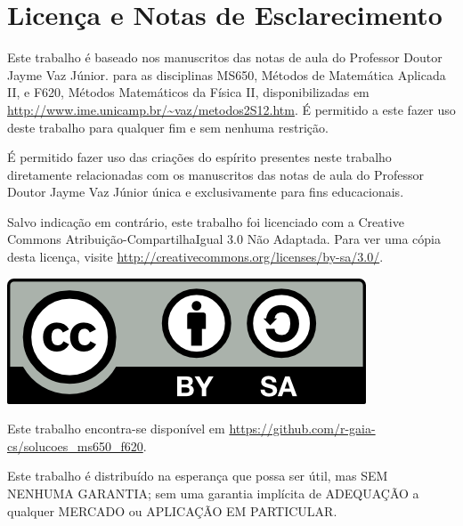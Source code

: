 %
%
%
%
%


\chapter{Licença e Notas de Esclarecimento}
Este trabalho é baseado nos manuscritos das notas de aula do Professor Doutor
Jayme Vaz Júnior. para as disciplinas MS650, Métodos de Matemática Aplicada II, e
F620, Métodos Matemáticos da Física II, disponibilizadas em
\url{http://www.ime.unicamp.br/~vaz/metodos2S12.htm}. É permitido a este fazer
uso deste trabalho para qualquer fim e sem nenhuma restrição.

É permitido fazer uso das criações do espírito presentes neste trabalho
diretamente relacionadas com os manuscritos das notas de aula do Professor
Doutor Jayme Vaz Júnior única e exclusivamente para fins educacionais.

Salvo indicação em contrário, este trabalho foi licenciado com a Creative
Commons Atribuição-CompartilhaIgual 3.0 Não Adaptada. Para ver uma cópia desta
licença, visite \url{http://creativecommons.org/licenses/by-sa/3.0/}.
\begin{center}
  \includegraphics[keepaspectratio=true]{cc-by-sa.png}
\end{center}

Este trabalho encontra-se disponível em
\url{https://github.com/r-gaia-cs/solucoes_ms650_f620}.

Este trabalho é distribuído na esperança que possa ser útil, mas SEM NENHUMA
GARANTIA; sem uma garantia implícita de ADEQUAÇÃO a qualquer MERCADO ou
APLICAÇÃO EM PARTICULAR.
